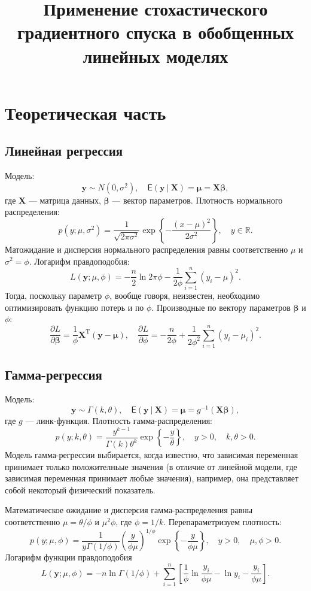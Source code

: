 \documentclass{article}
\title{Применение стохастического градиентного спуска в обобщенных линейных моделях}
\date{}
\begin{document}
\maketitle

\section{Теоретическая часть}
\subsection{Линейная регрессия}
Модель:
\[
    \mathbf{y}\sim N(0, \sigma^2),\quad \mathsf{E}(\mathbf{y}~|~\mathbf{X})=\bm\mu=\mathbf{X} \bm\beta,
\]
где $\mathbf{X}$ — матрица данных, $\boldsymbol\beta$ — вектор параметров. Плотность нормального распределения:
\[
    p(y; \mu, \sigma^2)=\frac1{\sqrt{2\pi\sigma^2}}\exp\left\{-\frac{(x-\mu)^2}{2\sigma^2}\right\},\quad y\in \mathbb{R}.
\]
Матожидание и дисперсия нормального распределения равны соответственно $\mu$ и $\sigma^2=\phi$. Логарифм правдоподобия:
\[
    L(\mathbf{y}; \mu, \phi)=-\frac{n}{2}\ln2\pi\phi-\frac{1}{2\phi}\sum_{i=1}^n(y_i-\mu)^2.
\]
Тогда, поскольку параметр $\phi$, вообще говоря, неизвестен, необходимо оптимизировать функцию потерь и по $\phi$. Производные по вектору параметров $\bm\beta$ и $\phi$:
\[
    \frac{\partial L}{\partial\bm\beta}=\frac1\phi\mathbf{X}^\mathrm{T}(\mathbf{y}-\bm\mu),\quad \frac{\partial L}{\partial \phi}=-\frac{n}{2\phi} + \frac{1}{2\phi^2}\sum_{i=1}^n(y_i-\mu_i)^2.
\]

\subsection{Гамма-регрессия}
Модель:
\[
    \mathbf{y}\sim\Gamma(k, \theta), \quad \mathsf{E}(\mathbf y~|~ \mathbf{X})=\bm\mu=g^{-1}(\mathbf{X}\bm{\beta}),
\]
где $g$ --- линк-функция.
Плотность гамма-распределения:
\[
    p(y; k, \theta) = \frac{y^{k-1}}{\Gamma(k)\theta^k}\exp\left\{-\frac{y}{\theta}\right\},\quad y > 0,\quad k, \theta > 0.
\]
Модель гамма-регрессии выбирается, когда известно, что зависимая переменная принимает только положителньые значения (в отличие от линейной модели, где зависимая переменная принимает любые значения), например, она представляет собой некоторый физический показатель.

Математическое ожидание и дисперсия гамма-распределения равны соответственно $\mu=\theta/\phi$ и $\mu^2 \phi$, где $\phi=1/k$. Перепараметризуем плотность:
\[
    p(y; \mu, \phi)=\frac{1}{y\Gamma(1/\phi)}\left(\frac{y}{\phi\mu}\right)^{1/\phi} \exp\left\{-\frac{y}{\phi\mu}\right\},\quad y > 0,\quad \mu,\phi>0.
\]
Логарифм функции правдоподобия
\[
    L(\mathbf{y}; \mu, \phi)=-n\ln\Gamma(1/\phi)+\sum_{i=1}^n\left[\frac1\phi\ln\frac{y_i}{\phi\mu} - \ln y_i- \frac{y_i}{\phi\mu} \right].
\]
\end{document}
